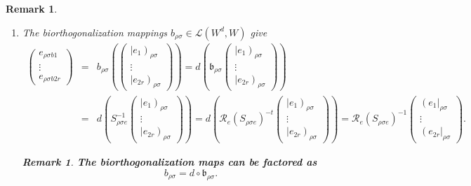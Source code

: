 \documentclass[aps,preprint]{revtex4}
\newtheorem{remark}[theorem]{Remark}
\begin{document}
\begin{remark}
\begin{enumerate}
\begin{enumerate}
\item The biorthogonalization mappings $b_{\rho \sigma }\in \mathcal{L}%
\left( W^{d},W\right) $ give 
\begin{eqnarray}
\left( 
\begin{array}{c}
e_{\rho \sigma b1} \\ 
\vdots \\ 
e_{\rho \sigma b2r}%
\end{array}%
\right) &=&b_{\rho \sigma }\left( \left( 
\begin{array}{c}
\left\vert e_{1}\right) _{\rho \sigma } \\ 
\vdots \\ 
\left\vert e_{2r}\right) _{\rho \sigma }%
\end{array}%
\right) \right) =d\left( \mathfrak{b}_{\rho \sigma }\left( 
\begin{array}{c}
\left\vert e_{1}\right) _{\rho \sigma } \\ 
\vdots \\ 
\left\vert e_{2r}\right) _{\rho \sigma }%
\end{array}%
\right) \right) \\
&=&d\left( S_{\rho \sigma e}^{-1}\left( 
\begin{array}{c}
\left\vert e_{1}\right) _{\rho \sigma } \\ 
\vdots \\ 
\left\vert e_{2r}\right) _{\rho \sigma }%
\end{array}%
\right) \right) =d\left( \mathcal{R}_{e}\left( S_{\rho \sigma e}\right)
^{-t}\left( 
\begin{array}{c}
\left\vert e_{1}\right) _{\rho \sigma } \\ 
\vdots \\ 
\left\vert e_{2r}\right) _{\rho \sigma }%
\end{array}%
\right) \right) =\mathcal{R}_{e}\left( S_{\rho \sigma e}\right) ^{-1}\left( 
\begin{array}{c}
\left( e_{1}\right\vert _{\rho \sigma } \\ 
\vdots \\ 
\left( e_{2r}\right\vert _{\rho \sigma }%
\end{array}%
\right) .
\end{eqnarray}

\begin{remark}
\textbf{The biorthogonalization maps can be factored as }%
\begin{equation}
b_{\rho \sigma }=d\circ \mathfrak{b}_{\rho \sigma }.
\end{equation}
\end{remark}


\end{enumerate}
\end{enumerate}
\end{remark}
\end{document}
